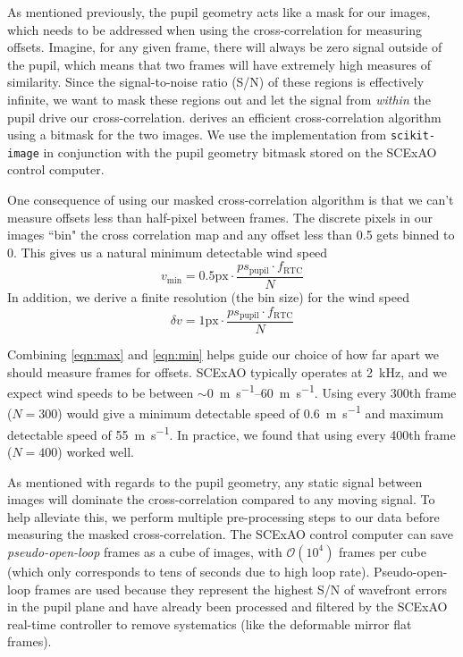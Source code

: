 As mentioned previously, the pupil geometry acts like a mask for our images, which needs to be addressed when using the cross-correlation for measuring offsets. Imagine, for any given frame, there will always be zero signal outside of the pupil, which means that two frames will have extremely high measures of similarity. Since the signal-to-noise ratio (S/N) of these regions is effectively infinite, we want to mask these regions out and let the signal from \textit{within} the pupil drive our cross-correlation. \citet{2012ITIP...21.2706P} derives an efficient cross-correlation algorithm using a bitmask for the two images. We use the implementation from \verb|scikit-image| \citep{2014arXiv1407.6245V} in conjunction with the pupil geometry bitmask stored on the SCExAO control computer.

One consequence of using our masked cross-correlation algorithm is that we can't measure offsets less than half-pixel between frames. The discrete pixels in our images ``bin" the cross correlation map and any offset less than \SI{0.5}{\pixel} gets binned to \SI{0}{\pixel}. This gives us a natural minimum detectable wind speed
\begin{equation}
    v_\mathrm{min} = 0.5\mathrm{ px}\cdot\frac{ps_\mathrm{pupil} \cdot f_\mathrm{RTC}}{N}
    \label{eqn:min}
\end{equation}
In addition, we derive a finite resolution (the bin size) for the wind speed
\begin{equation}
    \delta v = 1\mathrm{ px} \cdot\frac{ps_\mathrm{pupil} \cdot f_\mathrm{RTC}}{N}
    \label{eqn:resolution}
\end{equation}

Combining \autoref{eqn:max} and \autoref{eqn:min} helps guide our choice of how far apart we should measure frames for offsets. SCExAO typically operates at \SI{2}{\kilo\hertz}, and we expect wind speeds to be between $\sim$\SIrange{0}{60}{\meter\per\second}. Using every 300th frame ($N=300$) would give a minimum detectable speed of \SI{0.6}{\meter\per\second} and maximum detectable speed of \SI{55}{\meter\per\second}. In practice, we found that using every 400th frame ($N=400$) worked well.

As mentioned with regards to the pupil geometry, any static signal between images will dominate the cross-correlation compared to any moving signal. To help alleviate this, we perform multiple pre-processing steps to our data before measuring the masked cross-correlation. The SCExAO control computer can save \textit{pseudo-open-loop} frames as a cube of images, with $\mathcal{O}(10^4)$ frames per cube (which only corresponds to tens of seconds due to high loop rate). Pseudo-open-loop frames are used because they represent the highest S/N of wavefront errors in the pupil plane and have already been processed and filtered by the SCExAO real-time controller to remove systematics (like the deformable mirror flat frames).


